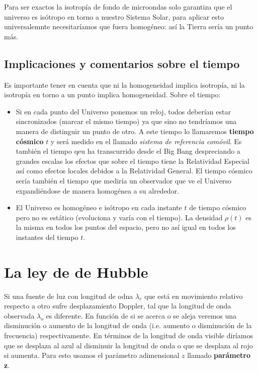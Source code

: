 Para ser exactos la isotropía de fondo de microondas solo garantiza que el universo es isótropo en torno a nuestro Sistema Solar, para aplicar esto universalemnte necesitaríamos que fuera homogéneo: así la Tierra sería un punto más.

\subsection{Implicaciones y comentarios sobre el tiempo}

Es importante tener en cuenta que ni la homogeneidad implica isotropía, ni la isotropía en torno a un punto implica homogeneidad. Sobre el tiempo:

\begin{itemize}
	\item Si en cada punto del Universo ponemos un reloj, todos deberían estar sincronizados (marcar el mismo tiempo) ya que sino no tendríamos una manera de distinguir un punto de otro. A este tiempo lo llamaremos \textbf{tiempo cósmico} $t$ y será medido en el llamado \textit{sistema de referencia comóvil}. Es también el tiempo qeu ha transcurrido desde el Big Bang despreciando a grandes escalas los efectos que sobre el tiempo tiene la Relatividad Especial así como efectos locales debidos a la Relatividad General. El tiempo cósmico sería también el tiempo que mediría un observador que ve el Universo expandiéndose de manera homogénea a su alrededor.
	\item El Universo es homogéneo e isótropo en cada instante $t$ de tiempo cósmico pero no es estático (evoluciona y varía con el tiempo). La densidad $\rho(t)$ es la misma en todos los puntos del espacio, pero no así igual en todos los instantes del tiempo $t$.
\end{itemize}

\section{La ley de de Hubble}

Si una fuente de luz con longitud de odna $\lambda_e$ que está en movimiento relativo respecto a otro sufre desplazamiento Doppler, tal que la longitud de onda observada $\lambda_o$ es diferente. En función de si se acerca o se aleja veremos una disminución o aumento de la longitud de onda (i.e. aumento o disminución de la frecuencia) respectivamente. En términos de la longitud de onda visible diríamos que se desplaza al azul al disminuir la longitud de onda o que se desplaza al rojo si aumenta. Para esto usamos el parámetro adimensional $z$ llamado \textbf{parámetro z}.

